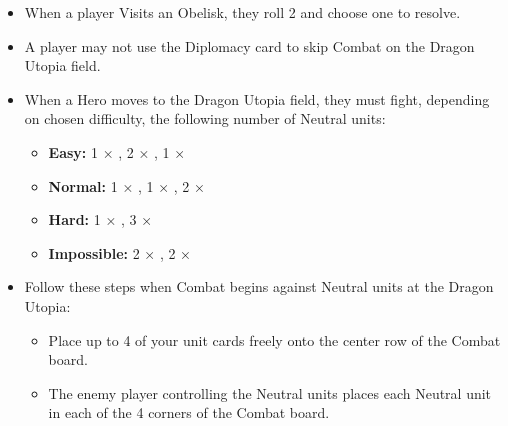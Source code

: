 \begin{multicols*}{2}
\begin{itemize}
  \item When a player Visits an Obelisk, they roll 2  and choose one to resolve.
  \item A player may not use the Diplomacy card to skip Combat on the Dragon Utopia field.
  \item When a Hero moves to the Dragon Utopia field, they must fight, depending on chosen difficulty, the following number of Neutral units:
  \begin{itemize}[leftmargin=15pt]
    \item \textbf{Easy:} 1 × , 2 × , 1 × 
    \item \textbf{Normal:} 1 × , 1 × , 2 × 
    \item \textbf{Hard:} 1 × , 3 × 
    \item \textbf{Impossible:}  2 × , 2 × 
  \end{itemize}
  \item Follow these steps when Combat begins against Neutral units at the Dragon Utopia:
  \begin{itemize}[leftmargin=15pt]
    \item Place up to 4 of your unit cards freely onto the center row of the Combat board.
    \item The enemy player controlling the Neutral units places each Neutral unit in each of the 4 corners of the Combat board.
  \end{itemize}
\end{itemize}

\end{multicols*}

